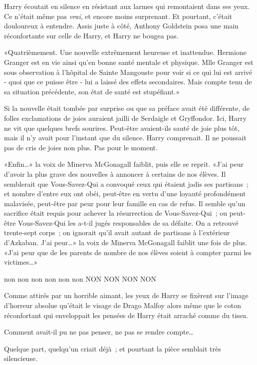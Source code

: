Harry écoutait en silence en résistant aux larmes qui remontaient dans ses yeux. Ce n'était même pas \emph{vrai}, et encore moins surprenant. Et pourtant, c'était douloureux à entendre. Assis juste à côté, Anthony Goldstein posa une main réconfortante sur celle de Harry, et Harry ne bougea pas.

«Quatrièmement. Une nouvelle extrêmement heureuse et inattendue. Hermione Granger est en vie ainsi qu'en bonne santé mentale et physique. Mlle Granger est sous observation à l'hôpital de Sainte Mangouste pour voir si ce qui lui est arrivé - quoi que ce puisse être - lui a laissé des effets secondaires. Mais compte tenu de sa situation précédente, son état de santé est stupéfiant.»

Si la nouvelle était tombée par surprise ou que sa préface avait été différente, de folles exclamations de joies auraient jailli de Serdaigle et Gryffondor. Ici, Harry ne vit que quelques brefs sourires. Peut-être avaient-ils sauté de joie plus tôt, mais il n'y avait pour l'instant que du silence. Harry comprenait. Il ne poussait pas de cris de joies non plus. Pas pour le moment.

«Enfin…» la voix de Minerva McGonagall faiblit, puis elle se reprit. «J'ai peur d'avoir la plus grave des nouvelles à annoncer à certains de nos élèves. Il semblerait que Vous-Savez-Qui a convoqué ceux qui étaient jadis ses partisans~; et nombre d'entre eux ont obéi, peut-être en vertu d'une loyauté profondément malavisée, peut-être par peur pour leur famille en cas de refus. Il semble qu'un sacrifice était requis pour achever la résurrection de Vous-Savez-Qui~; ou peut-être Vous-Savez-Qui les a-t-il jugés responsables de sa défaite. On a retrouvé trente-sept corps~; on ignorait qu'il avait autant de partisans à l'extérieur d'Azkaban. J'ai peur…» la voix de Minerva McGonagall faiblit une fois de plus. «J'ai peur que de les parents de nombre de nos élèves soient à compter parmi les victimes…»

non non non non non non NON NON NON NON

Comme attirés par un horrible aimant, les yeux de Harry se fixèrent sur l'image d'horreur absolue qu'était le visage de Drago Malfoy alors même que le coton réconfortant qui enveloppait les pensées de Harry était arraché comme du tissu.

Comment avait-il pu ne pas penser, ne pas se rendre compte…

Quelque part, quelqu'un criait déjà~; et pourtant la pièce semblait très silencieuse.

